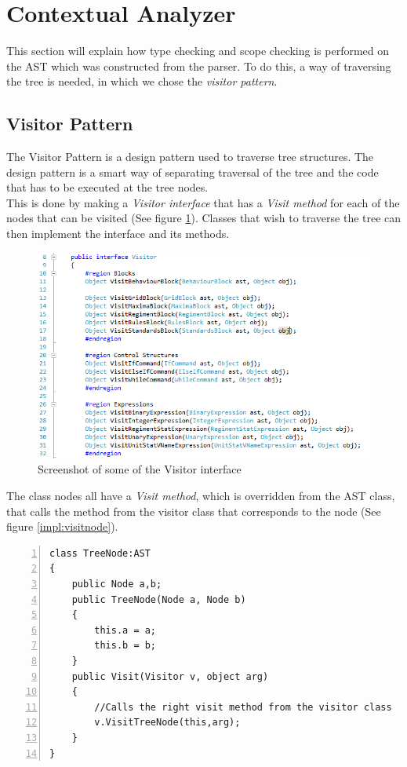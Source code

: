 \section{Contextual Analyzer}
	This section will explain how type checking and scope checking is performed on the AST which was constructed from the parser.
	To do this, a way of traversing the tree is needed, in which we chose the \textit{visitor pattern}.
	
	\subsection{Visitor Pattern}\label{impl:visitorinterface}
		The Visitor Pattern is a design pattern used to traverse tree structures. 
		The design pattern is a smart way of separating traversal of the tree and the code that has to be executed at the tree nodes. \\
		This is done by making a {\it Visitor interface} that has a {\it Visit method} for each of the nodes that 
		can be visited (See figure \ref{impl:visitor}). Classes that wish to traverse the tree can then implement the interface and its methods.
		\begin{figure}[H]
		\center
			\includegraphics[scale=0.8]{rapport/6/figures/visitorinterface.png}
			\caption{Screenshot of some of the Visitor interface}
			\label{impl:visitor}
		\end{figure}
	
		The class nodes all have a {\it Visit method}, 
		which is overridden from the AST class, that calls the method from the visitor class 
		that corresponds to the node (See figure \ref{impl:visitnode}). 
			\begin{lstlisting}[basicstyle=\small\sffamily,
					keywords={break,case,const,continue,default,else,enum,
					for,if,return,switch,while,do,long,void,int,float,double,
					char,struct,typedef,include,size\_t},
					keywordstyle={\color{blue}},
					comment={[l]{//}}, morecomment={[s]{/*}{*/}}, commentstyle=\itshape,
					columns={[l]flexible}, numbers=left, numberstyle=\tiny,
					frameround=fftt, frame=shadowbox, captionpos=b,
					caption={Example of a node class with a Visit method},
					label=impl:visitnode]
class TreeNode:AST
{
	public Node a,b;
	public TreeNode(Node a, Node b)
	{
		this.a = a;
		this.b = b;
	}
	public Visit(Visitor v, object arg)
	{
		//Calls the right visit method from the visitor class
		v.VisitTreeNode(this,arg);
	}
}
			 \end{lstlisting}
	
